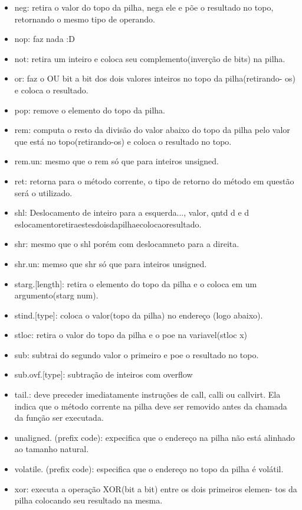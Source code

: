 \documentclass{article}
\begin{document}
\begin{itemize}
\item neg: retira o valor do topo da pilha, nega ele e põe o resultado no topo,
retornando o mesmo tipo de operando.
\item nop: faz nada :D
\item not: retira um inteiro e coloca seu complemento(inverção de bits) na
pilha.
\item or: faz o OU bit a bit dos dois valores inteiros no topo da pilha(retirando-
os) e coloca o resultado.
\item pop: remove o elemento do topo da pilha.
\item rem: computa o resto da divisão do valor abaixo do topo da pilha pelo
valor que está no topo(retirando-os) e coloca o resultado no topo.
\item rem.un: mesmo que o rem só que para inteiros unsigned.
\item ret: retorna para o método corrente, o tipo de retorno do método em
questão será o utilizado.
\item shl: Deslocamento de inteiro para a esquerda...,
valor, qntd d e d eslocamentoretiraestesdoisdapilhaecolocaoresultado.
\item shr: mesmo que o shl porém com deslocamneto para a direita.
\item shr.un: memso que shr só que para inteiros unsigned.
\item starg.[length]: retira o elemento do topo da pilha e o coloca em um
argumento(starg num).
\item stind.[type]: coloca o valor(topo da pilha) no endereço (logo abaixo).
\item stloc: retira o valor do topo da pilha e o poe na variavel(stloc x)
\item sub: subtrai do segundo valor o primeiro e poe o resultado no topo.
\item sub.ovf.[type]: subtração de inteiros com overflow
\item tail.: deve preceder imediatamente instruções de call, calli ou callvirt.
Ela indica que o método corrente na pilha deve ser removido antes da
chamada da função ser executada.
\item unaligned. (prefix code): expecifica que o endereço na pilha não está
alinhado ao tamanho natural.
\item volatile. (prefix code): especifica que o endereço no topo da pilha é
volátil.
\item xor: executa a operação XOR(bit a bit) entre os dois primeiros elemen-
tos da pilha colocando seu resultado na mesma.

\end{itemize}
\end{document}
